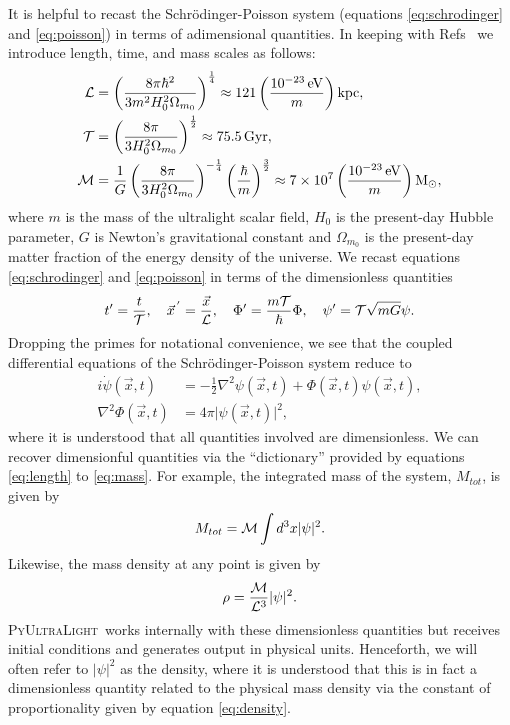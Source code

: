 \documentclass[a4paper,11pt]{article}
\newcommand{\PyUltraLight}{\textsc{PyUltraLight}\xspace}
\begin{document}
It is helpful to recast the Schr{\"o}dinger-Poisson system (equations \ref{eq:schrodinger} and \ref{eq:poisson}) in terms of adimensional quantities. In keeping with Refs~\cite{Schive2014,Paredes2016} we introduce length, time, and mass scales as follows:
\begin{align}
    \CMcal{L}&=\left(\frac{8\pi\hbar^2}{3 m^2H_0^2\Omega_{m_0}}\right)^{\frac{1}{4}}\approx121\left(\frac{10^{-23}\operatorname{eV}}{m}\right)\operatorname{kpc},\label{eq:length}\\
    \CMcal{T}&=\left(\frac{8\pi}{3 H_0^2\Omega_{m_0}}\right)^{\frac{1}{2}}\approx75.5 \operatorname{Gyr},\label{eq:time}\\
    \CMcal{M}&=\frac{1}{G}\left(\frac{8\pi}{3 H_0^2\Omega_{m_0}}\right)^{-\frac{1}{4}}\left(\frac{\hbar}{m}\right)^{\frac{3}{2}}\approx 7\times 10^7\left(\frac{10^{-23}\operatorname{eV}}{m}\right)\operatorname{M}_{\odot},\label{eq:mass}
\end{align}
where $m$ is the mass of the ultralight scalar field, $H_0$ is the present-day Hubble parameter, $G$ is Newton's gravitational constant and $\Omega_{m_0}$ is the present-day matter fraction of the energy density of the universe. We  recast equations \ref{eq:schrodinger} and \ref{eq:poisson} in terms of the  dimensionless quantities
\begin{equation}\label{eq:dimensionless}
    t'=\frac{t}{\CMcal{T}},\quad
    \vec{x}^{\,'}=\frac{\vec{x}}{\CMcal{L}},\quad
    \Phi'=\frac{m\CMcal{T}}{\hbar}\Phi,\quad
    \psi'=\CMcal{T}\sqrt{mG}\psi.
\end{equation}
Dropping the primes for notational convenience, we see that the coupled differential equations of the  Schr{\"o}dinger-Poisson system  reduce to 
\begin{align}
    i\Dot{\psi}(\vec{x},t)&=-\frac{1}{2}\nabla^2\psi(\vec{x},t)+\Phi(\vec{x},t)\psi(\vec{x},t),\label{eq:s-adim}\\
    \nabla^2\Phi(\vec{x},t)&=4\pi\vert\psi(\vec{x},t)\vert^2,\label{eq:p-adim}
\end{align}
where it is understood that all quantities involved are dimensionless. We can recover  dimensionful quantities via the ``dictionary'' provided by equations \ref{eq:length} to \ref{eq:mass}. For example, the integrated mass of the system, $M_{tot}$, is given by
\begin{equation}\label{eq:integrated-mass}
    M_{tot}=\CMcal{M}\int d^3x\vert\psi\vert^2.
\end{equation}
Likewise, the mass density at any point is given by
\begin{equation}\label{eq:density}
    \rho=\frac{\CMcal{M}}{\CMcal{L}^3}\vert\psi\vert^2.
\end{equation}
\PyUltraLight\ works internally with these dimensionless quantities but receives initial conditions and generates output in physical units. Henceforth, we will often refer to $\vert\psi\vert^2$  as the density, where it is understood that this is in fact a dimensionless quantity related to the physical mass density via the constant of proportionality given by equation \ref{eq:density}.
\end{document}
